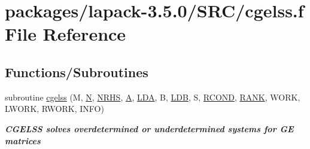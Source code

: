 \hypertarget{cgelss_8f}{}\section{packages/lapack-\/3.5.0/\+S\+R\+C/cgelss.f File Reference}
\label{cgelss_8f}
\subsection*{Functions/\+Subroutines}
\begin{DoxyCompactItemize}
\item 
subroutine \hyperlink{group__complexGEsolve_ga104cdf5ce9195df46ace1749820a7d4a}{cgelss} (M, \hyperlink{polmisc_8c_a0240ac851181b84ac374872dc5434ee4}{N}, \hyperlink{example__user_8c_aa0138da002ce2a90360df2f521eb3198}{N\+R\+H\+S}, \hyperlink{classA}{A}, \hyperlink{example__user_8c_ae946da542ce0db94dced19b2ecefd1aa}{L\+D\+A}, B, \hyperlink{example__user_8c_a50e90a7104df172b5a89a06c47fcca04}{L\+D\+B}, S, \hyperlink{superlu__enum__consts_8h_af00a42ecad444bbda75cde1b64bd7e72a9b5c151728d8512307565994c89919d5}{R\+C\+O\+N\+D}, \hyperlink{splinemodule_8c_a3a88bcc63386de30443dacede2e01847}{R\+A\+N\+K}, W\+O\+R\+K, L\+W\+O\+R\+K, R\+W\+O\+R\+K, I\+N\+F\+O)
\begin{DoxyCompactList}\small\item\em {\bfseries  C\+G\+E\+L\+S\+S solves overdetermined or underdetermined systems for G\+E matrices} \end{DoxyCompactList}\end{DoxyCompactItemize}
